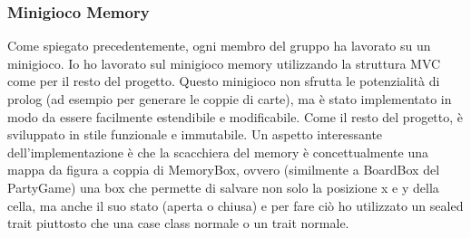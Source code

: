 \subsubsection{Minigioco Memory}
Come spiegato precedentemente, ogni membro del gruppo ha lavorato su un minigioco. Io ho lavorato sul minigioco memory utilizzando
la struttura MVC come per il resto del progetto. Questo minigioco non sfrutta le potenzialità di prolog (ad esempio per generare
le coppie di carte), ma è stato implementato in modo da essere facilmente estendibile e modificabile. Come il resto del progetto,
è sviluppato in stile funzionale e immutabile. Un aspetto interessante dell'implementazione è che la scacchiera del memory è 
concettualmente una mappa da figura a coppia di MemoryBox, ovvero (similmente a BoardBox del PartyGame) una box che permette di 
salvare non solo la posizione x e y della cella, ma anche il suo stato (aperta o chiusa) e per fare ciò ho utilizzato un sealed
trait piuttosto che una case class normale o un trait normale.